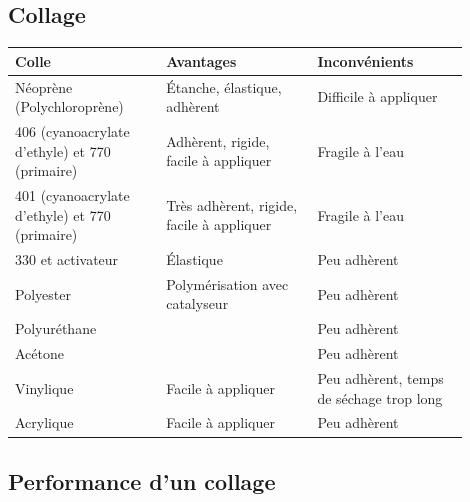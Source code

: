 \subsection{Collage}

\begin{frame}
	\begin{tabular}{|p{0.3\linewidth}|p{0.3\linewidth}|p{0.3\linewidth}|}
		\hline
		Colle & Avantages & Inconvénients \\
		\hline

		\rowcolor{OrangeT}
		Néoprène (Polychloroprène) &
		Étanche, élastique, adhèrent &
		Difficile à appliquer \\
		\hline

		\rowcolor{OrangeT}
		406 (cyanoacrylate d'ethyle) et 770 (primaire) &
		Adhèrent, rigide, facile à appliquer &
		Fragile à l'eau \\
		\hline

		\rowcolor{GreenT}
		401 (cyanoacrylate d'ethyle) et 770 (primaire) &
		Très adhèrent, rigide, facile à appliquer &
		Fragile à l'eau \\
		\hline

		\rowcolor{RedT}
		330 et activateur &
		Élastique &
		Peu adhèrent \\
		\hline

		\rowcolor{RedT}
		Polyester &
		Polymérisation avec catalyseur &
		Peu adhèrent \\
		\hline
		
		\rowcolor{RedT}
		Polyuréthane &
		& Peu adhèrent \\
		\hline

		\rowcolor{RedT}
		Acétone &
		& Peu adhèrent \\
		\hline
		
		\rowcolor{RedT}
		Vinylique &
		Facile à appliquer &
		Peu adhèrent, temps de séchage trop long \\
		\hline

		\rowcolor{RedT}
		Acrylique &
		Facile à appliquer &
		Peu adhèrent \\
		\hline

	\end{tabular}
\end{frame}

\subsection{Performance d'un collage}

